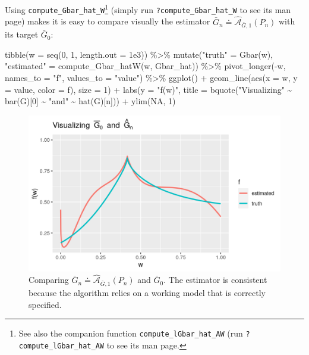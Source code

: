 \documentclass[
  11pt,
  openright,twoside]{book}
\newenvironment{Shaded}{\begin{snugshade}}{\end{snugshade}}
\newcommand{\AttributeTok}[1]{\textcolor[rgb]{0.77,0.63,0.00}{#1}}
\newcommand{\ConstantTok}[1]{\textcolor[rgb]{0.00,0.00,0.00}{#1}}
\newcommand{\DecValTok}[1]{\textcolor[rgb]{0.00,0.00,0.81}{#1}}
\newcommand{\FloatTok}[1]{\textcolor[rgb]{0.00,0.00,0.81}{#1}}
\newcommand{\FunctionTok}[1]{\textcolor[rgb]{0.00,0.00,0.00}{#1}}
\newcommand{\NormalTok}[1]{#1}
\newcommand{\OtherTok}[1]{\textcolor[rgb]{0.56,0.35,0.01}{#1}}
\newcommand{\SpecialCharTok}[1]{\textcolor[rgb]{0.00,0.00,0.00}{#1}}
\newcommand{\StringTok}[1]{\textcolor[rgb]{0.31,0.60,0.02}{#1}}
\newcommand{\Algo}{\widehat{\mathcal{A}}}
\newcommand{\defq}{\doteq}
\newcommand{\Gbar}{\bar{G}}
\theoremstyle{definition}
\theoremstyle{definition}
\theoremstyle{definition}
\theoremstyle{definition}
\theoremstyle{remark}
\begin{document}
Using \texttt{compute\_Gbar\_hat\_W}\footnote{See also the companion function
  \texttt{compute\_lGbar\_hat\_AW} (run \texttt{?compute\_lGbar\_hat\_AW} to see its man page.}
(simply run \texttt{?compute\_Gbar\_hat\_W} to see its man page) makes it is easy to
compare visually the estimator \(\Gbar_{n} \defq \Algo_{\Gbar,1}(P_{n})\) with
its target \(\Gbar_0\):



\begin{Shaded}
\begin{Highlighting}[]
\FunctionTok{tibble}\NormalTok{(}\AttributeTok{w =} \FunctionTok{seq}\NormalTok{(}\DecValTok{0}\NormalTok{, }\DecValTok{1}\NormalTok{, }\AttributeTok{length.out =} \FloatTok{1e3}\NormalTok{)) }\SpecialCharTok{\%\textgreater{}\%}
  \FunctionTok{mutate}\NormalTok{(}\StringTok{"truth"} \OtherTok{=} \FunctionTok{Gbar}\NormalTok{(w),}
         \StringTok{"estimated"} \OtherTok{=} \FunctionTok{compute\_Gbar\_hatW}\NormalTok{(w, Gbar\_hat)) }\SpecialCharTok{\%\textgreater{}\%}
  \FunctionTok{pivot\_longer}\NormalTok{(}\SpecialCharTok{{-}}\NormalTok{w, }\AttributeTok{names\_to =} \StringTok{"f"}\NormalTok{, }\AttributeTok{values\_to =} \StringTok{"value"}\NormalTok{) }\SpecialCharTok{\%\textgreater{}\%}
  \FunctionTok{ggplot}\NormalTok{() }\SpecialCharTok{+}
  \FunctionTok{geom\_line}\NormalTok{(}\FunctionTok{aes}\NormalTok{(}\AttributeTok{x =}\NormalTok{ w, }\AttributeTok{y =}\NormalTok{ value, }\AttributeTok{color =}\NormalTok{ f), }\AttributeTok{size =} \DecValTok{1}\NormalTok{) }\SpecialCharTok{+}
  \FunctionTok{labs}\NormalTok{(}\AttributeTok{y =} \StringTok{"f(w)"}\NormalTok{,}
       \AttributeTok{title =} \FunctionTok{bquote}\NormalTok{(}\StringTok{"Visualizing"} \SpecialCharTok{\textasciitilde{}} \FunctionTok{bar}\NormalTok{(G)[}\DecValTok{0}\NormalTok{] }\SpecialCharTok{\textasciitilde{}} \StringTok{"and"} \SpecialCharTok{\textasciitilde{}} \FunctionTok{hat}\NormalTok{(G)[n])) }\SpecialCharTok{+}
  \FunctionTok{ylim}\NormalTok{(}\ConstantTok{NA}\NormalTok{, }\DecValTok{1}\NormalTok{)}
\end{Highlighting}
\end{Shaded}

\begin{figure}

{\centering \includegraphics[width=0.7\linewidth]{img/estimate-Gbar-three-1} 

}

\caption{Comparing \(\Gbar_{n}\defq \Algo_{\Gbar,1}(P_{n})\) and \(\Gbar_{0}\). The estimator is consistent because the algorithm relies on a working model that is correctly specified.}\label{fig:estimate-Gbar-three}
\end{figure}
\end{document}
